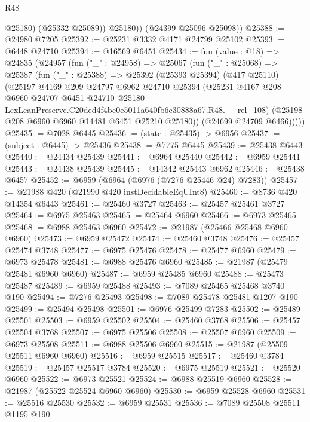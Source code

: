 \begin{lexlean}{R48}
\begin{coremodule}
              @25180)
            (@25332 @25089))
          @25180))
      (@24399 @25096 @25098))
@25388 := @24980 @7205
@25392 := @25231 @3332 @4171 @24799 @25102
@25393 := @6448 @24710
@25394 := @16569 @6451
@25434 := fun (value : @18) =>
  @24835
    (@24957
      (fun ("_" : @24958) =>
      @25067
        (fun ("_" : @25068) =>
        @25387
          (fun ("_" : @25388) =>
          @25392
            (@25393 @25394)
            (@417 @25110)
            (@25197
              @4169
              @209
              @24797
              @6962
              @24710
              @25394
              (@25231
                @4167
                @208
                @6960
                @24707
                @6451
                @24710
                @25180
                LexLeanPreserve.C20ded4f4be0e5011a640fb6c30888a67.R48.__rel_108)
              (@25198 @208 @6960 @6960 @14481 @6451 @25210 @25180))
            (@24699 @24709 @6466)))))
@25435 := @7028 @6445
@25436 := (state : @25435) -> @6956
@25437 := (subject : @6445) -> @25436
@25438 := @7775 @6445
@25439 := @25438 @6443
@25440 := @24434 @25439
@25441 := @6964 @25440
@25442 := @6959 @25441
@25443 := @24438 @25439
@25445 := @14342 @25443 @6962
@25446 := @25438 @6457
@25452 := @6959 (@6964 (@6976 (@7276 @25446 @24) @7283))
@25457 := @21988 @420 (@21990 @420 instDecidableEqUInt8)
@25460 := @8736 @420 @14354 @6443
@25461 := @25460 @3727
@25463 := @25457 @25461 @3727
@25464 := @6975 @25463
@25465 := @25464 @6960
@25466 := @6973 @25465
@25468 := @6988 @25463 @6960
@25472 := @21987 (@25466 @25468 @6960 @6960)
@25473 := @6959 @25472
@25474 := @25460 @3748
@25476 := @25457 @25474 @3748
@25477 := @6975 @25476
@25478 := @25477 @6960
@25479 := @6973 @25478
@25481 := @6988 @25476 @6960
@25485 := @21987 (@25479 @25481 @6960 @6960)
@25487 := @6959 @25485 @6960
@25488 := @25473 @25487
@25489 := @6959 @25488
@25493 := @7089 @25465 @25468 @3740 @190
@25494 := @7276 @25493
@25498 := @7089 @25478 @25481 @1207 @190
@25499 := @25494 @25498
@25501 := @6976 @25499 @7283
@25502 := @25489 @25501
@25503 := @6959 @25502
@25504 := @25460 @3768
@25506 := @25457 @25504 @3768
@25507 := @6975 @25506
@25508 := @25507 @6960
@25509 := @6973 @25508
@25511 := @6988 @25506 @6960
@25515 := @21987 (@25509 @25511 @6960 @6960)
@25516 := @6959 @25515
@25517 := @25460 @3784
@25519 := @25457 @25517 @3784
@25520 := @6975 @25519
@25521 := @25520 @6960
@25522 := @6973 @25521
@25524 := @6988 @25519 @6960
@25528 := @21987 (@25522 @25524 @6960 @6960)
@25530 := @6959 @25528 @6960
@25531 := @25516 @25530
@25532 := @6959 @25531
@25536 := @7089 @25508 @25511 @1195 @190

\end{coremodule}
\end{lexlean}
